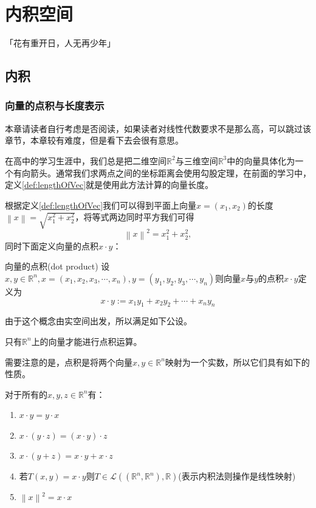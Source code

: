 \chapter{内积空间}
\begin{center}
	「花有重开日，人无再少年」
\end{center}
\vspace{-5pt}
\begin{center}
\end{center}

\section{内积}

\subsection{向量的点积与长度表示}

本章请读者自行考虑是否阅读，如果读者对线性代数要求不是那么高，可以跳过该章节，本章较有难度，但是看下去会很有意思。

在高中的学习生涯中，我们总是把二维空间$\mathbb{R}^2$与三维空间$\mathbb{R}^3$中的向量具体化为一个有向箭头。通常我们求两点之间的坐标距离会使用勾股定理，在前面的学习中，定义\ref{def:lengthOfVec}就是使用此方法计算的向量长度。

根据定义\ref{def:lengthOfVec}我们可以得到平面上向量$x=(x_1,x_2)$的长度$\left \| x \right \|=\sqrt{x_1^2+x_2^2} $，将等式两边同时平方我们可得$$\left \| x \right \| ^2=x_1^2+x_2^2,$$同时下面定义向量的点积$x \cdot y$：

\begin{definition}{向量的点积(dot product)}
	设$x,y \in \mathbb{R}^n,x=(x_1,x_2,x_3,\cdots,x_n),y=(y_1,y_2,y_3,\cdots,y_n)$则向量$x$与$y$的点积$x\cdot y$定义为$$x\cdot y := x_1y_1+x_2y_2+\cdots+x_ny_n$$
\end{definition}

由于这个概念由实空间出发，所以满足如下公设。

\begin{postulate}
	只有$\mathbb{R}^n$上的向量才能进行点积运算。
\end{postulate}

需要注意的是，点积是将两个向量$x,y\in \mathbb{R}^n$映射为一个实数，所以它们具有如下的性质。

\begin{corollary}
	对于所有的$x,y,z\in \mathbb{R}^n$有：
	\begin{enumerate}
		\item $x\cdot y=y\cdot x$
		\item $x\cdot (y\cdot z)=(x\cdot y)\cdot z$
		\item $x\cdot (y+ z)=x\cdot y+x\cdot z$
		\item 若$T(x,y)=x\cdot y$则$T\in \mathcal{L}((\mathbb{R}^n,\mathbb{R}^n),\mathbb{R})$(表示内积法则操作是线性映射)
		\item $\left \| x \right \| ^2=x\cdot x$
	\end{enumerate}
\end{corollary}

